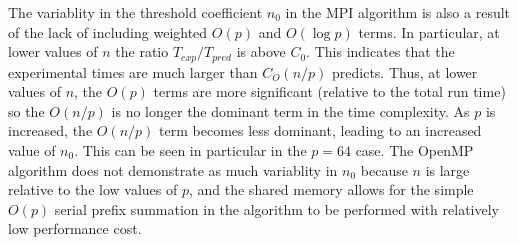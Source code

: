 \documentclass[12pt]{article}
\begin{document}
{{{{The variablity in the threshold coefficient $n_0$ in the MPI algorithm is also a result of the lack of
including weighted $O(p)$ and $O(\log p)$ terms.  In particular, at lower values of
$n$ the ratio $T_{exp}/T_{pred}$ is above $C_0$.  This indicates that the
experimental times are much larger than $C_O(n/p)$ predicts.  Thus, at lower values of
$n$, the $O(p)$ terms are more significant (relative to the total run time) so the
$O(n/p)$ is no longer the dominant term in the time complexity.  As $p$ is increased,
the $O(n/p)$ term becomes less dominant, leading to an increased value of $n_0$. This
can be seen in particular in the $p=64$ case.  The OpenMP algorithm does not
demonstrate as much variablity in $n_0$ because $n$ is large relative to the low
values of $p$, and the shared memory allows for the simple $O(p)$ serial prefix
summation in the algorithm to be performed with relatively low performance cost.

}}}}
\end{document}
